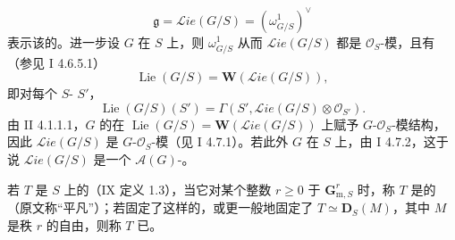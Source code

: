 \[
\mathfrak g=\mathscr{L}\!ie(G/S)=(\omega^1_{G/S})^\vee
\]
表示该的。进一步设 $G$ 在 $S$ 上，则 $\omega^1_{G/S}$ 从而 $\mathscr{L}\!ie(G/S)$ 都是 $\mathscr O_S$-模，且有（参见 I 4.6.5.1）
\[
\operatorname{Lie}(G/S)=\mathbf W(\mathscr{L}\!ie(G/S)),
\]
即对每个 $S$- $S'$，
\[
\operatorname{Lie}(G/S)(S')=\Gamma(S',\mathscr{L}\!ie(G/S)\otimes\mathscr O_{S'}).
\]
由 II 4.1.1.1，$G$ 的在 $\operatorname{Lie}(G/S)=\mathbf W(\mathscr{L}\!ie(G/S))$ 上赋予 $G$-$\mathscr O_S$-模结构，因此 $\mathscr{L}\!ie(G/S)$ 是 $G$-$\mathscr O_S$-模（见 I 4.7.1）。若此外 $G$ 在 $S$ 上，由 I 4.7.2，这于说 $\mathscr{L}\!ie(G/S)$ 是一个 $\mathscr A(G)$-。

若 $T$ 是 $S$ 上的（IX 定义 1.3），当它对某个整数 $r\ge0$ 于 $\mathbf G_{\mathrm m,S}^r$ 时，称 $T$ 是的（原文称“平凡”）；若固定了这样的，或更一般地固定了 $T\simeq\mathbf D_S(M)$，其中 $M$ 是秩 $r$ 的自由，则称 $T$ 已。

